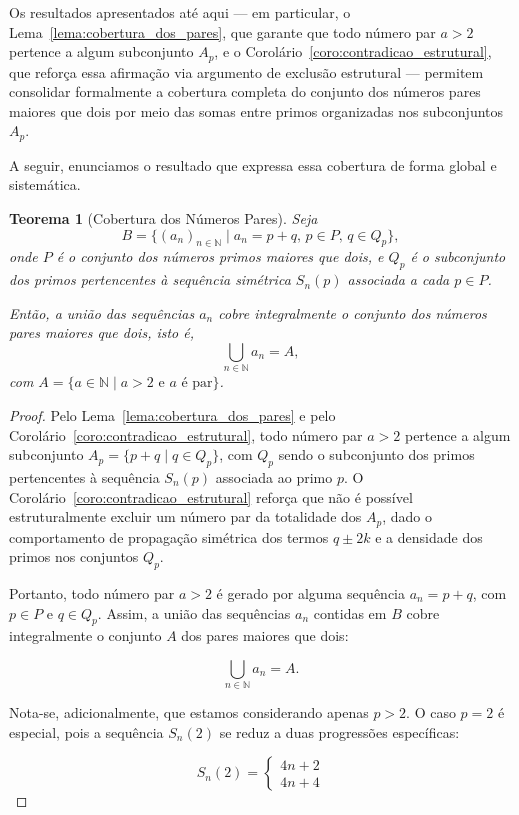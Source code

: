\documentclass[a4paper,11pt]{article}
\newtheorem{theorem}{Teorema}[section]
\theoremstyle{definition}
\theoremstyle{remark}
\begin{document}
\begin{otherlanguage}{brazil}
	Os resultados apresentados até aqui — em particular, o Lema~\ref{lema:cobertura_dos_pares}, que garante que todo número par \( a > 2 \) pertence a algum subconjunto \( A_p \), e o Corolário~\ref{coro:contradicao_estrutural}, que reforça essa afirmação via argumento de exclusão estrutural — permitem consolidar formalmente a cobertura completa do conjunto dos números pares maiores que dois por meio das somas entre primos organizadas nos subconjuntos \( A_p \).
	
	A seguir, enunciamos o resultado que expressa essa cobertura de forma global e sistemática.
	
	\begin{theorem}[Cobertura dos Números Pares]\label{teo:cobertura_dos_pares}
		Seja
		\[
		B = \{(a_n)_{n \in \mathbb{N}} \mid a_n = p + q,\, p \in P,\, q \in Q_p\},
		\]
		onde \(P\) é o conjunto dos números primos maiores que dois, e \(Q_p\) é o subconjunto dos primos pertencentes à sequência simétrica \(S_n(p)\) associada a cada \(p \in P\).
		
		Então, a união das sequências \(a_n\) cobre integralmente o conjunto dos números pares maiores que dois, isto é,
		\[
		\bigcup_{n \in \mathbb{N}} a_n = A,
		\]
		com \(A = \{a \in \mathbb{N} \mid a > 2 \text{ e } a \text{ é par} \}\).
	\end{theorem}
	\begin{proof}
		Pelo Lema~\ref{lema:cobertura_dos_pares} e pelo Corolário~\ref{coro:contradicao_estrutural}, todo número par \(a > 2\) pertence a algum subconjunto \(A_p = \{p + q \mid q \in Q_p\}\), com \(Q_p\) sendo o subconjunto dos primos pertencentes à sequência \(S_n(p)\) associada ao primo \(p\). O Corolário~\ref{coro:contradicao_estrutural} reforça que não é possível estruturalmente excluir um número par da totalidade dos \(A_p\), dado o comportamento de propagação simétrica dos termos \(q \pm 2k\) e a densidade dos primos nos conjuntos \(Q_p\).
		
		Portanto, todo número par \(a > 2\) é gerado por alguma sequência \(a_n = p + q\), com \(p \in P\) e \(q \in Q_p\). Assim, a união das sequências \(a_n\) contidas em \(B\) cobre integralmente o conjunto \(A\) dos pares maiores que dois:
		
		\[
		\bigcup_{n \in \mathbb{N}} a_n = A.
		\]
		
			Nota-se, adicionalmente, que estamos considerando apenas \(p > 2\). O caso \(p = 2\) é especial, pois a sequência \(S_n(2)\) se reduz a duas progressões específicas:
		
		\[
		S_n(2) =
		\begin{cases}
			4n + 2 \\
			4n + 4
		\end{cases}
		\]
		

\end{proof}
\end{otherlanguage}
\end{document}
